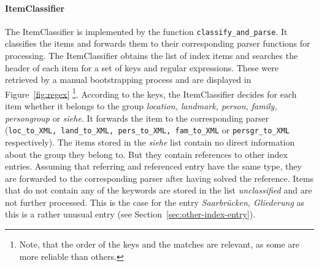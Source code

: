 \paragraph{ItemClassifier}
\label{sec:classifier}
The ItemClassifier is implemented by the function
\texttt{classify\_and\_parse}. It classifies the items and forwards
them to their corresponding parser functions for processing. The
ItemClassifier obtains the list of index items and searches the header
of each item for a set of keys and regular expressions. These were
retrieved by a manual bootstrapping process and are displayed in
Figure~\ref{fig:regex} \footnote{Note, that the order of the keys and
  the matches are relevant, as some are more reliable than others.}.
According to the keys, the ItemClassifier decides for each item
whether it belongs to the group \textit{location, landmark, person,
  family, persongroup} or \textit{siehe}. It forwards the item to the
corresponding parser (\texttt{loc\_to\_XML, land\_to\_XML,
  pers\_to\_XML, fam\_to\_XML} or \texttt{persgr\_to\_XML}
respectively). The items stored in the \textit{siehe} list contain no
direct information about the group they belong to. But they contain
references to other index entries. Assuming that referring and
referenced entry have the same type, they are forwarded to the
corresponding parser after having solved the reference. Items that do
not contain any of the keywords are stored in the list
\textit{unclassified} and are not further processed. This is the case
for the entry \textit{Saarbrücken, Gliederung} as this is a rather
unusual entry (see Section~\ref{sec:other-index-entry}).

